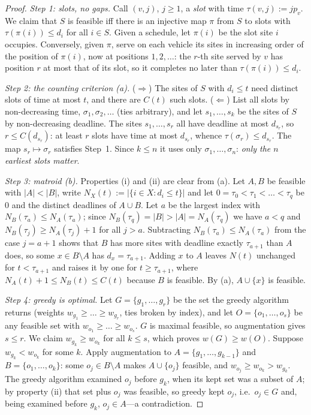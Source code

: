 \documentclass[pdflatex,sn-mathphys-ay]{sn-jnl}
\theoremstyle{thmstyleone}
\theoremstyle{thmstyletwo}
\theoremstyle{thmstylethree}
\begin{document}
\begin{proof}
\emph{Step 1: slots, no gaps.} Call $(v,j)$, $j\ge1$, a \emph{slot} with
time $\tau(v,j):=jp_v$. We claim that $S$ is feasible iff there is an
injective map $\pi$ from $S$ to slots with $\tau(\pi(i))\le d_i$ for all
$i\in S$. Given a schedule, let $\pi(i)$ be the slot site $i$ occupies.
Conversely, given $\pi$, serve on each vehicle its sites in increasing
order of the position of $\pi(i)$, now at positions $1,2,\dots$: the
$r$-th site served by $v$ has position $r$ at most that of its slot, so it
completes no later than $\tau(\pi(i))\le d_i$.

\emph{Step 2: the counting criterion (a).} ($\Rightarrow$) The sites of
$S$ with $d_i\le t$ need distinct slots of time at most $t$, and there
are $C(t)$ such slots. ($\Leftarrow$) List all slots by non-decreasing
time, $\sigma_1,\sigma_2,\dots$ (ties arbitrary), and let $s_1,\dots,s_k$
be the sites of $S$ by non-decreasing deadline. The sites $s_1,\dots,s_r$
all have deadline at most $d_{s_r}$, so $r\le C(d_{s_r})$: at least $r$
slots have time at most $d_{s_r}$, whence $\tau(\sigma_r)\le d_{s_r}$. The
map $s_r\mapsto\sigma_r$ satisfies Step~1. Since $k\le n$ it uses only
$\sigma_1,\dots,\sigma_n$: \emph{only the $n$ earliest slots matter}.

\emph{Step 3: matroid (b).} Properties (i) and (ii) are clear from (a).
Let $A,B$ be feasible with $|A|<|B|$, write $N_X(t):=|\{i\in X:d_i\le t\}|$
and let $0=\tau_0<\tau_1<\dots<\tau_q$ be $0$ and the distinct deadlines
of $A\cup B$. Let $a$ be the largest index with $N_B(\tau_a)\le
N_A(\tau_a)$; since $N_B(\tau_q)=|B|>|A|=N_A(\tau_q)$ we have $a<q$ and
$N_B(\tau_j)\ge N_A(\tau_j)+1$ for all $j>a$. Subtracting
$N_B(\tau_a)\le N_A(\tau_a)$ from the case $j=a+1$ shows that $B$ has more
sites with deadline exactly $\tau_{a+1}$ than $A$ does, so some
$x\in B\setminus A$ has $d_x=\tau_{a+1}$. Adding $x$ to $A$ leaves $N(t)$
unchanged for $t<\tau_{a+1}$ and raises it by one for $t\ge\tau_{a+1}$,
where $N_A(t)+1\le N_B(t)\le C(t)$ because $B$ is feasible. By (a),
$A\cup\{x\}$ is feasible.

\emph{Step 4: greedy is optimal.} Let $G=\{g_1,\dots,g_r\}$ be the set the
greedy algorithm returns (weights $w_{g_1}\ge\dots\ge w_{g_r}$, ties
broken by index), and let $O=\{o_1,\dots,o_s\}$ be any feasible set with
$w_{o_1}\ge\dots\ge w_{o_s}$. $G$ is maximal feasible, so augmentation
gives $s\le r$. We claim $w_{g_k}\ge w_{o_k}$ for all $k\le s$, which
proves $w(G)\ge w(O)$. Suppose $w_{g_k}<w_{o_k}$ for some $k$. Apply
augmentation to $A=\{g_1,\dots,g_{k-1}\}$ and $B=\{o_1,\dots,o_k\}$: some
$o_j\in B\setminus A$ makes $A\cup\{o_j\}$ feasible, and
$w_{o_j}\ge w_{o_k}>w_{g_k}$. The greedy algorithm examined $o_j$ before
$g_k$, when its kept set was a subset of $A$; by property (ii) that set
plus $o_j$ was feasible, so greedy kept $o_j$, i.e.\ $o_j\in G$ and, being
examined before $g_k$, $o_j\in A$---a contradiction.


\end{proof}
\end{document}
